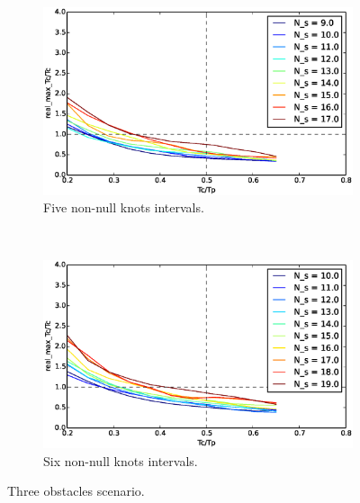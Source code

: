 \begin{figure}
        ~ %
        \begin{subfigure}[b]{0.48\textwidth}
                \includegraphics[width=\textwidth]{./img/realtime/Scenario_3__N_knots_5/uni.eps}
                \caption{Five non-null knots intervals.}\label{fig:uni35}
        \end{subfigure}
        ~ %
        \begin{subfigure}[b]{0.48\textwidth}
                \includegraphics[width=\textwidth]{./img/realtime/Scenario_3__N_knots_6/uni.eps}
                \caption{Six non-null knots intervals.}\label{fig:uni36}
        \end{subfigure}
        \caption{Three obstacles scenario.}\label{fig:uni3}
\end{figure}

